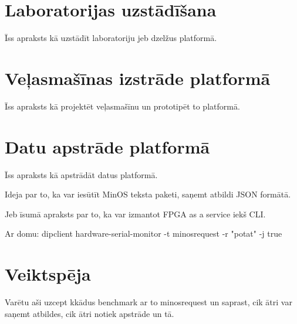 \section{Laboratorijas uzstādīšana}

Īss apraksts kā uzstādīt laboratoriju jeb dzelžus platformā.

\section{Veļasmašīnas izstrāde platformā}

Īss apraksts kā projektēt veļasmašīnu un prototipēt to platformā.

\section{Datu apstrāde platformā}

Īss apraksts kā apstrādāt datus platformā.  

Ideja par to, ka var iesūtīt MinOS teksta paketi, saņemt atbildi JSON formātā.  

Jeb īsumā apraksts par to, ka var izmantot FPGA as a service iekš CLI.  

Ar domu: dipclient hardware-serial-monitor -t minosrequest -r "potat" -j true

\section{Veiktspēja}

Varētu aši uzcept kkādus benchmark ar to minosrequest un saprast, cik ātri var saņemt atbildes, cik ātri notiek apstrāde un tā.
